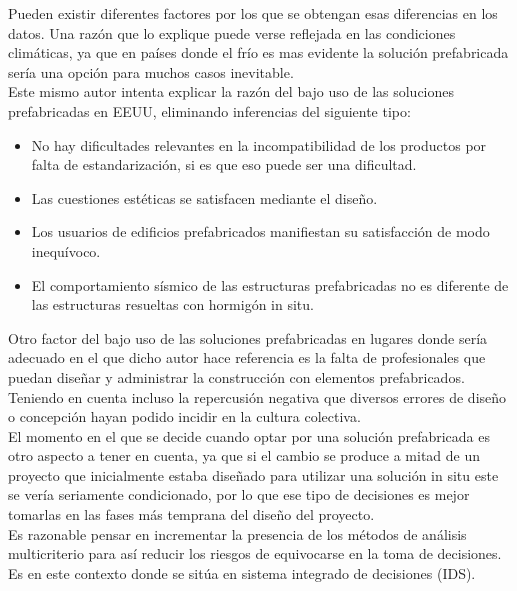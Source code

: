 \documentclass[10pt]{article}
\begin{document}
	Pueden existir diferentes factores por los que se obtengan esas diferencias en los datos. Una razón que lo explique puede verse reflejada en las condiciones climáticas, ya que en países donde el frío es mas evidente la solución prefabricada sería una opción para muchos casos inevitable. \\
	
	Este mismo autor intenta explicar la razón del bajo uso de las soluciones prefabricadas en EEUU, eliminando inferencias del siguiente tipo:

\begin{itemize}
	
	\item No hay dificultades relevantes en la incompatibilidad de los productos por falta de estandarización, si es que eso puede ser una dificultad.
	
	\item Las cuestiones estéticas se satisfacen mediante el diseño.
	
	\item Los usuarios de edificios prefabricados manifiestan su satisfacción de modo inequívoco.
	
	\item El comportamiento sísmico de las estructuras prefabricadas no es diferente de las estructuras resueltas con hormigón in situ.  

\end{itemize}

Otro factor del bajo uso de las soluciones prefabricadas en lugares donde sería adecuado en el que dicho autor hace referencia es la falta de profesionales que puedan diseñar y administrar la construcción con elementos prefabricados. Teniendo en cuenta incluso la repercusión negativa que diversos errores de diseño o concepción hayan podido incidir en la cultura colectiva.\\

	El momento en el que se decide cuando optar por una solución prefabricada es otro aspecto a tener en cuenta, ya que si el cambio se produce a mitad de un proyecto que inicialmente estaba diseñado para utilizar una solución in situ este se vería seriamente condicionado, por lo que ese tipo de decisiones es mejor tomarlas en las fases más temprana del diseño del proyecto.\\

	Es razonable pensar en incrementar la presencia de los métodos de análisis multicriterio para así reducir los riesgos de equivocarse en la toma de decisiones. Es en este contexto donde se sitúa en sistema integrado de decisiones (IDS).\\
	
\end{document}
